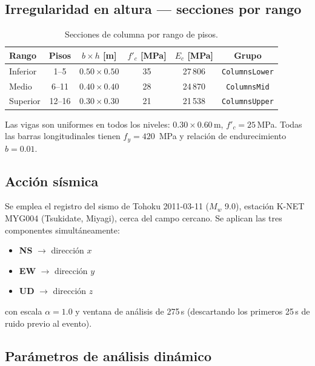 \subsection{Irregularidad en altura --- secciones por rango}

\begin{table}[htbp]
  \centering
  \caption{Secciones de columna por rango de pisos.}
  \label{tab:ms16-col-sections}
  \begin{tabular}{lccccc}
    \toprule
    Rango  & Pisos & $b\times h$ [m] & $f'_c$ [MPa]
           & $E_c$ [MPa] & Grupo \\
    \midrule
    Inferior & 1--5   & $0.50\times0.50$ & 35 & 27\,806 & \texttt{ColumnsLower} \\
    Medio    & 6--11  & $0.40\times0.40$ & 28 & 24\,870 & \texttt{ColumnsMid}   \\
    Superior & 12--16 & $0.30\times0.30$ & 21 & 21\,538 & \texttt{ColumnsUpper} \\
    \bottomrule
  \end{tabular}
\end{table}

Las vigas son uniformes en todos los niveles: $0{.}30\times 0{.}60$\,m,
$f'_c = 25$\,MPa.  Todas las barras longitudinales tienen $f_y = 420$\,
MPa y relación de endurecimiento $b = 0{.}01$.

\subsection{Acción sísmica}

Se emplea el registro del sismo de Tohoku 2011-03-11 ($M_w$ 9.0),
estación K-NET MYG004 (Tsukidate, Miyagi), cerca del campo cercano.
Se aplican las tres componentes simultáneamente:
\begin{itemize}
  \item \textbf{NS} $\rightarrow$ dirección $x$
  \item \textbf{EW} $\rightarrow$ dirección $y$
  \item \textbf{UD} $\rightarrow$ dirección $z$
\end{itemize}
con escala $\alpha = 1{.}0$ y ventana de análisis de 275\,s (descartando
los primeros 25\,s de ruido previo al evento).

\subsection{Parámetros de análisis dinámico}

